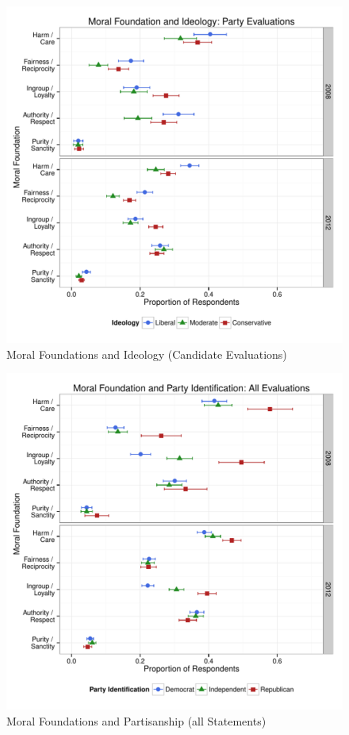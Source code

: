 \documentclass[12pt]{article}
\begin{document}
\begin{figure}\centering
\includegraphics[scale=.4]{../calc/fig/p3_mft_ideol_pa.pdf}
\caption{Moral Foundations and Ideology (Candidate Evaluations)}\label{fig:mft_ideol_ca}
\end{figure}

\begin{figure}[ht]\centering
\includegraphics[scale=.4]{../calc/fig/a1_mft_pid.pdf}
\caption{Moral Foundations and Partisanship (all Statements)}\label{fig:a1_mft_pid}
\end{figure}
\end{document}
